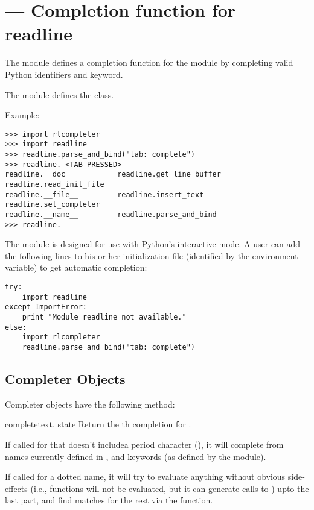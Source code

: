 \section{ ---
         Completion function for readline}


The  module defines a completion function for
the  module by completing valid Python identifiers and
keyword.

The  module defines the  class.

Example:

\begin{verbatim}
>>> import rlcompleter
>>> import readline
>>> readline.parse_and_bind("tab: complete")
>>> readline. <TAB PRESSED>
readline.__doc__          readline.get_line_buffer  readline.read_init_file
readline.__file__         readline.insert_text      readline.set_completer
readline.__name__         readline.parse_and_bind
>>> readline.
\end{verbatim}

The  module is designed for use with Python's
interactive mode.  A user can add the following lines to his or her
initialization file (identified by the 
environment variable) to get automatic  completion:

\begin{verbatim}
try:
    import readline
except ImportError:
    print "Module readline not available."
else:
    import rlcompleter
    readline.parse_and_bind("tab: complete")
\end{verbatim}


\subsection{Completer Objects \label{completer-objects}}

Completer objects have the following method:

\begin{methoddesc}[Completer]{complete}{text, state}
Return the th completion for .

If called for  that doesn't includea period character
(), it will complete from names currently defined in
,  and
keywords (as defined by the  module).

If called for a dotted name, it will try to evaluate anything without
obvious side-effects (i.e., functions will not be evaluated, but it
can generate calls to ) upto the last part, and
find matches for the rest via the  function.
\end{methoddesc}

